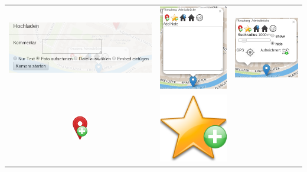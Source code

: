 \begin{table}[H]
  \begin{tabulary}{\columnwidth}{ C C C }
	\includegraphics[scale=0.5]{bilder/screenshots/menu_arbeitsmarker_upload.png} &
	\includegraphics[scale=0.55]{bilder/screenshots/menu_arbeitsmarker_bookmark.png} &
	\includegraphics[scale=0.55]{bilder/screenshots/menu_arbeitsmarker_radar.png} \\
	\includegraphics[scale=0.55]{bilder/icons/add-marker.png} &
	\includegraphics[scale=0.15]{bilder/icons/add-bookmark.png} &

\end{tabulary}
\end{table}
